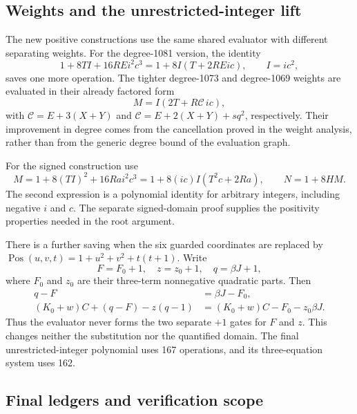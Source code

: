 \documentclass[11pt,letterpaper]{article}
\DeclareMathOperator{\Pos}{Pos}
\theoremstyle{remark}
\begin{document}
\subsection{Weights and the unrestricted-integer lift}

The new positive constructions use the same shared evaluator with different
separating weights. For the degree-1081 version, the identity
\[
 1+8TI+16REi^2c^3=1+8I(T+2REic),\qquad I=ic^2,
\]
saves one more operation. The tighter degree-1073 and degree-1069 weights
are evaluated in their already factored form
\[
 M=I(2T+R\mathcal C\,ic),
\]
with $\mathcal C=E+3(X+Y)$ and
$\mathcal C=E+2(X+Y)+sq^2$, respectively. Their improvement in degree
comes from the cancellation proved in the weight analysis, rather than
from the generic degree bound of the evaluation graph.

For the signed construction use
\[
 M=1+8(TI)^2+16Ra i^2c^3
   =1+8(ic)I(T^2c+2Ra),\qquad N=1+8HM.
\]
The second expression is a polynomial identity for arbitrary integers,
including negative $i$ and $c$. The separate signed-domain proof supplies
the positivity properties needed in the root argument.

There is a further saving when the six guarded coordinates are replaced by
$\Pos(u,v,t)=1+u^2+v^2+t(t+1)$. Write
\[
 F=F_0+1,\quad z=z_0+1,\quad q=\beta J+1,
\]
where $F_0$ and $z_0$ are their three-term nonnegative quadratic parts.
Then
\begin{align*}
 q-F&=\beta J-F_0,\\
 (K_0+w)C+(q-F)-z(q-1)
   &=(K_0+w)C-F_0-z_0\beta J.
\end{align*}
Thus the evaluator never forms the two separate $+1$ gates for $F$ and
$z$. This changes neither the substitution nor the quantified domain.
The final unrestricted-integer polynomial uses 167 operations, and its
three-equation system uses 162.

\subsection{Final ledgers and verification scope}
\end{document}

